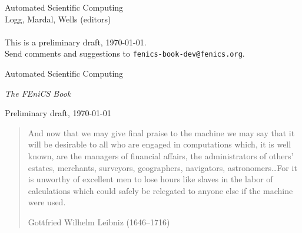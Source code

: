 \thispagestyle{empty}
\newpage
\changepage{-4.9cm}{-4cm}{}{2cm}{}{}{}{}{}
\pagecolor{white}

\null\vfill
\noindent
\begin{minipage}{\textwidth}
  Automated Scientific Computing \\
  Logg, Mardal, Wells (editors) \\ \\
  This is a preliminary draft, \today. \\
  Send comments and suggestions to \texttt{fenics-book-dev@fenics.org}.
\end{minipage}
\newpage

\begin{center}

  \vspace{1cm}

  \LARGE

  Automated Scientific Computing

  \vspace{1cm}

  \emph{The FEniCS Book}

  \vfill

  \Large

  Preliminary draft, \today

\end{center}
\cleardoublepage

\null\vspace{5cm}
\linespread{1.5}
\begin{center}
  \begin{quote}
    \it

    And now that we may give final praise to the machine we may say that
    it will be desirable to all who are engaged in computations which, it
    is well known, are the managers of financial affairs, the
    administrators of others' estates, merchants, surveyors, geographers,
    navigators, astronomers\ldots For it is unworthy of excellent men to lose
    hours like slaves in the labor of calculations which could safely be
    relegated to anyone else if the machine were used.
    
    \rm

    \vspace{0.5cm}
    
    Gottfried Wilhelm Leibniz (1646--1716)
  \end{quote}
\end{center}
\linespread{1.0}
\cleardoublepage

\pagestyle{fancy}
